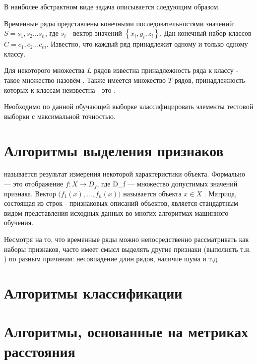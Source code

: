 В наиболее абстрактном виде задача описывается следующим образом. 

Временные ряды представлены конечными последовательностями значений: $S=s_1,s_2...s_n$, где $s_i$ - вектор значений $\left\{x_i,y_i,z_i\right\}$. Дан конечный набор классов $C=c_1,c_2...c_m$. Известно, что каждый ряд принадлежит одному и только одному классу. 

Для некоторого множества $L$ рядов известна принадлежность ряда к классу - такое множество назовём . Также имеется множество $T$ рядов, принадлежность которых к классам неизвестна - это .

Необходимо по данной обучающей выборке классифицировать элементы тестовой выборки с максимальной точностью.

\section{Алгоритмы выделения признаков}

 называется результат измерения некоторой характеристики объекта. Формально  — это отображение $f: X\to D_f $, где D\_f — множество допустимых значений признака. Вектор $\bigl( f_1(x),\ldots,f_n(x) \bigr)$ называется  объекта $x \in X$ \cite{features_def}. Матрица, состоящая из строк - признаковых описаний объектов, является стандартным видом представления исходных данных во многих алгоритмах машинного обучения. 

Несмотря на то, что временные ряды можно непосредственно рассматривать как наборы признаков, часто имеет смысл выделять другие признаки (выполнять т.н. ) по разным причинам: несовпадение длин рядов, наличие шума и т.д.







\section{Алгоритмы классификации}








\section{Алгоритмы, основанные на метриках расстояния}

